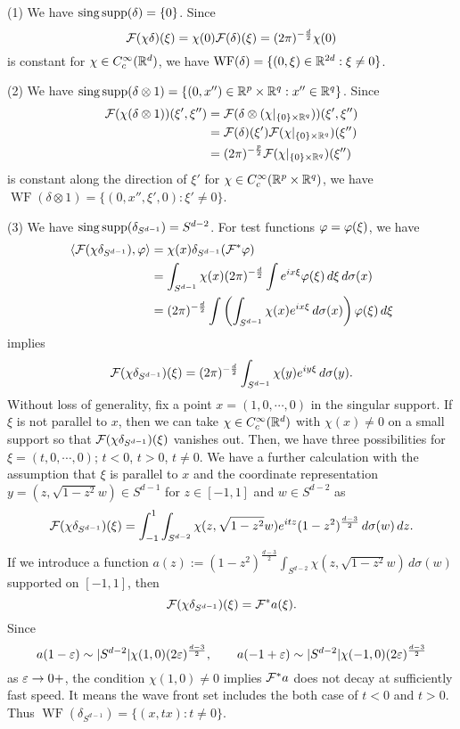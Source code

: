 \documentclass{../../../small}
\begin{document}
\begin{pf}[Solution of 4]
(1)
We have $\operatorname{sing}\operatorname{supp}(\delta)=\{0\}$.
Since
\[\mathcal{F}(\chi\delta)(\xi)=\chi(0)\mathcal{F}(\delta)(\xi)=(2\pi)^{-\frac d2}\chi(0)\]
is constant for $\chi\in C_c^\infty(\mathbb{R}^d)$, we have $\operatorname{WF}(\delta)=\{(0,\xi)\in\mathbb{R}^{2d}:\xi\ne0\}$.

(2)
We have $\operatorname{sing}\operatorname{supp}(\delta\otimes1)=\{(0,x'')\in\mathbb{R}^p\times\mathbb{R}^q:x''\in\mathbb{R}^q\}$.
Since
\begin{align*}
\mathcal{F}(\chi(\delta\otimes1))(\xi',\xi'')
&=\mathcal{F}(\delta\otimes(\chi|_{\{0\}\times\mathbb{R}^q}))(\xi',\xi'')\\
&=\mathcal{F}(\delta)(\xi')\mathcal{F}(\chi|_{\{0\}\times\mathbb{R}^q})(\xi'')\\
&=(2\pi)^{-\frac p2}\mathcal{F}(\chi|_{\{0\}\times\mathbb{R}^q})(\xi'')
\end{align*}
is constant along the direction of $\xi'$ for $\chi\in C_c^\infty(\mathbb{R}^p\times\mathbb{R}^q)$, we have $\operatorname{WF}(\delta\otimes1)=\{(0,x'',\xi',0):\xi'\ne0\}$.

(3)
We have $\operatorname{sing}\operatorname{supp}(\delta_{S^{d-1}})=S^{d-2}$.
For test functions $\varphi=\varphi(\xi)$, we have
\begin{align*}
\langle\mathcal{F}(\chi\delta_{S^{d-1}}),\varphi\rangle
&=\chi(x)\delta_{S^{d-1}}(\mathcal{F}^*\varphi)\\
&=\int_{S^{d-1}}\chi(x)(2\pi)^{-\frac d2}\int e^{ix\xi}\varphi(\xi)\,d\xi\,d\sigma(x)\\
&=(2\pi)^{-\frac d2}\int\left(\int_{S^{d-1}}\chi(x)e^{ix\xi}\,d\sigma(x)\right)\varphi(\xi)\,d\xi
\end{align*}
implies
\[\mathcal{F}(\chi\delta_{S^{d-1}})(\xi)=(2\pi)^{-\frac d2}\int_{S^{d-1}}\chi(y)e^{iy\xi}\,d\sigma(y).\]
Without loss of generality, fix a point $x=(1,0,\cdots,0)$ in the singular support.
If $\xi$ is not parallel to $x$, then we can take $\chi\in C_c^\infty(\mathbb{R}^d)$ with $\chi(x)\ne0$ on a small support so that $\mathcal{F}(\chi\delta_{S^{d-1}})(\xi)$ vanishes out.
Then, we have three possibilities for $\xi=(t,0,\cdots,0)$; $t<0$, $t>0$, $t\ne0$.
We have a further calculation with the assumption that $\xi$ is parallel to $x$ and the coordinate representation $y=(z,\sqrt{1-z^2}w)\in S^{d-1}$ for $z\in[-1,1]$ and $w\in S^{d-2}$ as
\[\mathcal{F}(\chi\delta_{S^{d-1}})(\xi)=\int_{-1}^1\int_{S^{d-2}}\chi(z,\sqrt{1-z^2}w)e^{itz}(1-z^2)^{\frac{d-3}2}\,d\sigma(w)\,dz.\]
If we introduce a function $a(z):=(1-z^2)^{\frac{d-3}2}\int_{S^{d-2}}\chi(z,\sqrt{1-z^2}w)\,d\sigma(w)$ supported on $[-1,1]$, then
\[\mathcal{F}(\chi\delta_{S^{d-1}})(\xi)=\mathcal{F}^*a(\xi).\]
Since 
\[a(1-\varepsilon)\sim|S^{d-2}|\chi(1,0)(2\varepsilon)^{\frac{d-3}2},\qquad a(-1+\varepsilon)\sim|S^{d-2}|\chi(-1,0)(2\varepsilon)^{\frac{d-3}2}\]
as $\varepsilon\to0+$, the condition $\chi(1,0)\ne0$ implies $\mathcal{F}^*a$ does not decay at sufficiently fast speed.
It means the wave front set includes the both case of $t<0$ and $t>0$.
Thus $\operatorname{WF}(\delta_{S^{d-1}})=\{(x,tx):t\ne0\}$.


\end{pf}
\end{document}
